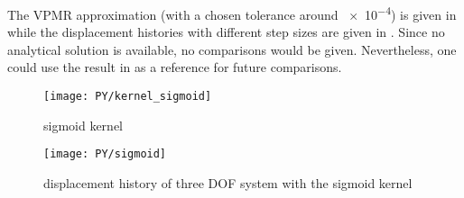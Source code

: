 The VPMR approximation (with a chosen tolerance around \num{e-4}) is given in  while the displacement histories with different step sizes are given in . Since no analytical solution is available, no comparisons would be given. Nevertheless, one could use the result in  as a reference for future comparisons.
\begin{figure}[H]
\centering
\texttt{[image: PY/kernel\_sigmoid]}
\caption{sigmoid kernel}\label{fig:sigmoid_kernel}
\end{figure}
\begin{figure}[H]
\centering
\texttt{[image: PY/sigmoid]}
\caption{displacement history of three DOF system with the sigmoid kernel}\label{fig:three_sigmoid}
\end{figure}